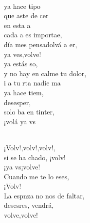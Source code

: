\begin{cancion}
\begin{chorus}
	\end{chorus}%
	\jump\\
	ya hace tipo\\
	que aste de cer\\
	 en esta a \\
	cada a es importae,\\
	día mes pensadolvá a er,\\
	ya ves,volve!\\
\jump
	ya estás so,\\
	y no hay en calme tu dolor,\\
	i a tu rta nadie ma \\
	ya hace tiem,\\
	desesper, \\
	solo ba en tinter,\\
	¡volá ya vs\\\jump\\
	\begin{chorus}%
	¡Volv!,volv!,volv!,     \\
	si se ha chado, ¡volv!\\
	¡ya vs¡volve!\\
	Cuando me te lo eses,\\
	¡Volv!\\
\jump
	La espnza no nos  de faltar,\\
	desesres, vendrá,\\
	volve,volve!\\
	\end{chorus}%
	\jump\\
\end{cancion}%

